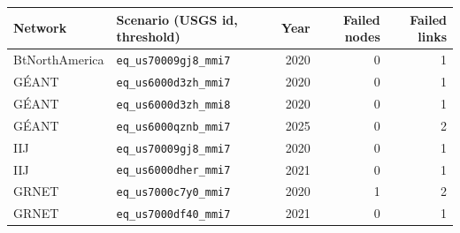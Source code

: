 \begin{tabular}{llrrr}
\toprule
Network & Scenario (USGS id, threshold) & Year & Failed nodes & Failed links \\
\midrule
BtNorthAmerica & \texttt{eq\_us70009gj8\_mmi7} & 2020 & 0 & 1 \\
G\'EANT & \texttt{eq\_us6000d3zh\_mmi7} & 2020 & 0 & 1 \\
G\'EANT & \texttt{eq\_us6000d3zh\_mmi8} & 2020 & 0 & 1 \\
G\'EANT & \texttt{eq\_us6000qznb\_mmi7} & 2025 & 0 & 2 \\
IIJ & \texttt{eq\_us70009gj8\_mmi7} & 2020 & 0 & 1 \\
IIJ & \texttt{eq\_us6000dher\_mmi7} & 2021 & 0 & 1 \\
GRNET & \texttt{eq\_us7000c7y0\_mmi7} & 2020 & 1 & 2 \\
GRNET & \texttt{eq\_us7000df40\_mmi7} & 2021 & 0 & 1 \\
\bottomrule
\end{tabular}
